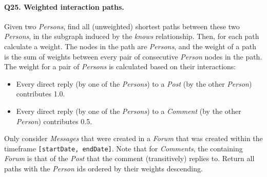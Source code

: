 \paragraph{\textbf{Q25}. Weighted interaction paths.}
Given two \emph{Persons}, find all (unweighted) shortest paths between
these two \emph{Persons}, in the subgraph induced by the \emph{knows}
relationship.
Then, for each path calculate a weight. The nodes in the path are
\emph{Persons}, and the weight of a path is the sum of weights between
every pair of consecutive \emph{Person} nodes in the path.
The weight for a pair of \emph{Persons} is calculated based on their
interactions:
\begin{itemize}
\tightlist
\item
  Every direct reply (by one of the \emph{Persons}) to a \emph{Post} (by
  the other \emph{Person}) contributes 1.0.
\item
  Every direct reply (by one of the \emph{Persons}) to a \emph{Comment}
  (by the other \emph{Person}) contributes 0.5.
\end{itemize}
Only consider \emph{Messages} that were created in a \emph{Forum} that
was created within the timeframe \texttt{{[}startDate,\ endDate{]}}.
Note that for \emph{Comments}, the containing \emph{Forum} is that of
the \emph{Post} that the comment (transitively) replies to.
Return all paths with the \emph{Person} ids ordered by their weights
descending.

